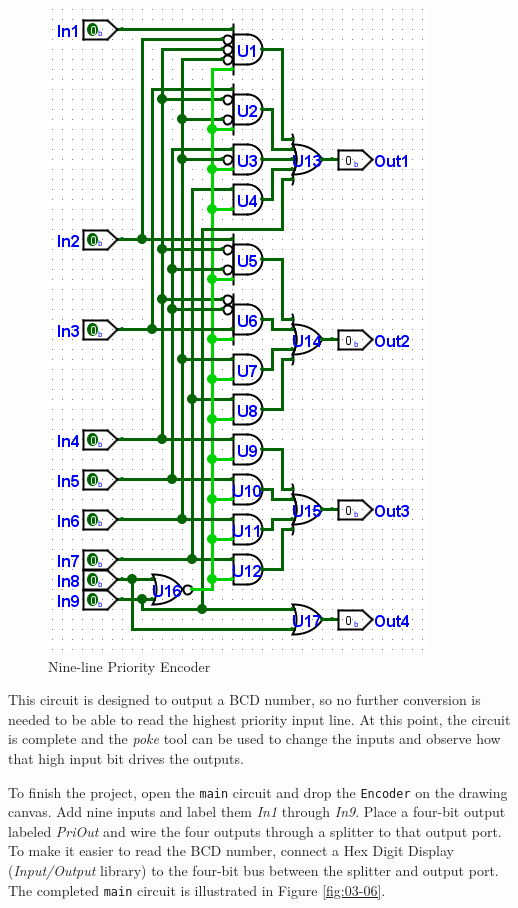 \begin{figure}[H]
	\centering
	\includegraphics[width=\maxwidth{.95\linewidth}]{gfx/03-05}
	\caption{Nine-line Priority Encoder}
	\label{fig:03-05}
\end{figure}

This circuit is designed to output a \acf{BCD} number, so no further conversion is needed to be able to read the highest priority input line. At this point, the circuit is complete and the \textit{poke} tool can be used to change the inputs and observe how that high input bit drives the outputs.

To finish the project, open the \lstinline[columns=fixed]|main| circuit and drop the \lstinline[columns=fixed]|Encoder| on the drawing canvas. Add nine inputs and label them \textit{In1} through \textit{In9}. Place a four-bit output labeled \textit{PriOut} and wire the four outputs through a splitter to that output port. To make it easier to read the \ac{BCD} number, connect a Hex Digit Display (\textit{Input/Output} library) to the four-bit bus between the splitter and output port. The completed \lstinline[columns=fixed]|main| circuit is illustrated in Figure \ref{fig:03-06}.

